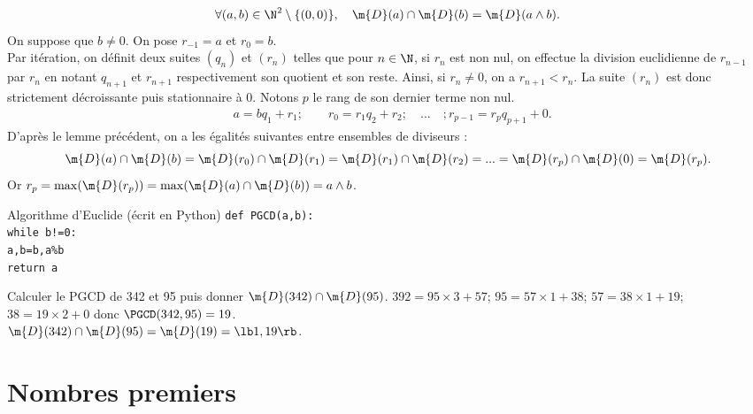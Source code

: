 \documentclass[11pt]{article}
\begin{document}
\begin{prop}{}{}
    \begin{equation*}
        \forall (a,b) \in \N^2 \setminus \{(0,0)\}, \quad \m{D}(a)\cap\m{D}(b)=\m{D}(a\land b).
    \end{equation*}
    \tcblower
    On suppose que $b\neq0$. On pose $r_{-1}=a$ et $r_0=b$.\\
    Par itération, on définit deux suites $(q_n)$ et $(r_n)$ telles que pour $n\in\N$, si $r_n$ est non nul, on effectue la division euclidienne de $r_{n-1}$ par $r_n$ en notant $q_{n+1}$ et $r_{n+1}$ respectivement son quotient et son reste. Ainsi, si $r_n\neq0$, on a $r_{n+1}<r_n$. La suite $(r_n)$ est donc strictement décroissante puis stationnaire à 0. Notons $p$ le rang de son dernier terme non nul.
    \begin{align*}
        &a=bq_1+r_1; \qquad r_0=r_1q_2+r_2; \quad ... \quad; r_{p-1}=r_pq_{p+1}+0.
    \end{align*}
    D'après le lemme précédent, on a les égalités suivantes entre ensembles de diviseurs :
    \begin{equation*}
        \m{D}(a)\cap\m{D}(b)=\m{D}(r_0)\cap\m{D}(r_1)=\m{D}(r_1)\cap\m{D}(r_2)=...=\m{D}(r_p)\cap\m{D}(0)=\m{D}(r_p).
    \end{equation*}
    Or $r_p=\max(\m{D}(r_p))=\max(\m{D}(a)\cap\m{D}(b))=a\land b$.
\end{prop}

\begin{algo}{Algorithme d'Euclide (écrit en Python)}{}
    \texttt{def PGCD(a,b):\\
    \hspace*{1cm} while b!=0:\\
    \hspace*{2cm} a,b=b,a\%b\\
    \hspace*{1cm} return a}
\end{algo}

\begin{ex}{}{}
    Calculer le PGCD de 342 et 95 puis donner $\m{D}(342)\cap\m{D}(95)$.
    \tcblower
    $392=95\times3+57$; $95=57\times1+38$; $57=38\times1+19$; $38=19\times2+0$ donc $\PGCD(342,95)=19$.\\
    $\m{D}(342)\cap\m{D}(95)=\m{D}(19)=\lb1,19\rb$.
\end{ex}

\section{Nombres premiers}
\end{document}
